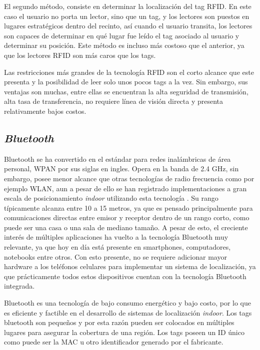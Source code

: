 El segundo método, consiste en determinar la localización del tag RFID. En este caso el usuario no porta un lector, sino que un tag, y los lectores son puestos en lugares estratégicos dentro del recinto, así cuando el usuario transita, los lectores son capaces de determinar en qué lugar fue leído el tag asociado al usuario y determinar su posición. Este método es incluso más costoso que el anterior, ya que los lectores RFID son más caros que los tags. 

Las restricciones más grandes de la tecnología RFID son el corto alcance que este presenta y la posibilidad de leer solo unos pocos tags a la vez. Sin embargo, sus ventajas son muchas, entre ellas se encuentran la alta seguridad de transmisión, alta tasa de transferencia, no requiere línea de visión directa y presenta relativamente bajos costos. 

\subsection{\textit{Bluetooth}}

Bluetooth se ha convertido en el estándar para redes inalámbricas de área personal, WPAN por sus siglas en ingles. Opera en la banda de 2.4 GHz, sin embargo, posee menor alcance que otras tecnologías de radio frecuencia como por ejemplo WLAN, aun a pesar de ello se han registrado implementaciones a gran escala de posicionamiento \textit{indoor} utilizando esta tecnología \citep{BT}. Su rango típicamente alcanza entre 10 a 15 metros, ya que es pensado principalmente para comunicaciones directas entre emisor y receptor dentro de un rango corto, como puede ser una casa o una sala de mediano tamaño. A pesar de esto, el creciente interés de múltiples aplicaciones ha vuelto a la tecnología Bluetooth muy relevante, ya que hoy en día está presente en smartphones, computadores, notebooks entre otros. Con esto presente, no se requiere adicionar mayor hardware a los teléfonos celulares para implementar un sistema de localización, ya que prácticamente todos estos dispositivos cuentan con la tecnología Bluetooth integrada.

Bluetooth es una tecnología de bajo consumo energético y bajo costo, por lo que es eficiente y factible en el desarrollo de sistemas de localización \textit{indoor}. Los tags bluetooth son pequeños y por esta razón pueden ser colocados en múltiples lugares para asegurar la cobertura de una región. Los tags poseen un ID único como puede ser la MAC u otro identificador generado por el fabricante.

